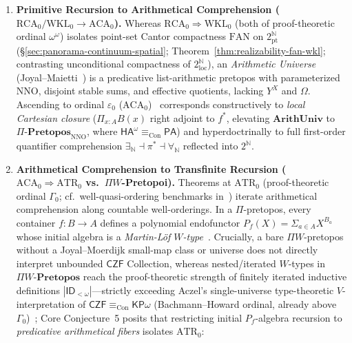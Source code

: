 \begin{enumerate}

  \item \textbf{Primitive Recursion to Arithmetical Comprehension ($\mathrm{RCA}_0 / \mathrm{WKL}_0 \to \mathrm{ACA}_0$).} Whereas $\mathrm{RCA}_0 \Rightarrow \mathrm{WKL}_0$ (both of proof-theoretic ordinal $\omega^\omega$) isolates point-set Cantor compactness $\mathrm{FAN}$ on $2^{\mathbb{N}}_{\mathrm{pt}}$ (\S\ref{sec:panorama-continuum-spatial}; Theorem~\ref{thm:realizability-fan-wkl}; contrasting unconditional compactness of $2^{\mathbb{N}}_{\mathrm{loc}}$), an \emph{Arithmetic Universe} (Joyal--Maietti~\cite{Maietti05}) is a predicative list-arithmetic pretopos with parameterized $\mathrm{NNO}$, disjoint stable sums, and effective quotients, lacking $Y^X$ and $\Omega$. Ascending to ordinal $\varepsilon_0$ ($\mathrm{ACA}_0$)~\cite{Friedman75,Simpson09} corresponds constructively to \emph{local Cartesian closure} ($\Pi_{x:A} B(x)$ right adjoint to $f^*$, elevating $\mathbf{ArithUniv}$ to $\Pi\text{-}\mathbf{Pretopos}_{\mathrm{NNO}}$, where $\mathsf{HA}^\omega \equiv_{\mathrm{Con}} \mathsf{PA}$) and hyperdoctrinally to full first-order quantifier comprehension $\exists_{\mathbb{N}} \dashv \pi^* \dashv \forall_{\mathbb{N}}$ reflected into $2^{\mathbb{N}}$.

  \item \textbf{Arithmetical Comprehension to Transfinite Recursion ($\mathrm{ACA}_0 \Rightarrow \mathrm{ATR}_0$ vs.\ $\Pi W$-Pretopoi).} Theorems at $\mathrm{ATR}_0$ (proof-theoretic ordinal $\Gamma_0$; cf.\ well-quasi-ordering benchmarks in~\cite{Friedman75,Simpson09}) iterate arithmetical comprehension along countable well-orderings. In a $\Pi$-pretopos, every container $f: B \to A$ defines a polynomial endofunctor $P_f(X) = \Sigma_{a \in A} X^{B_a}$ whose initial algebra is a \emph{Martin-L\"of $W$-type}~\cite{Maietti05}. Crucially, a bare $\Pi W$-pretopos without a Joyal--Moerdijk small-map class or universe does not directly interpret unbounded $\mathsf{CZF}$ Collection, whereas nested/iterated $W$-types in $\Pi W\text{-}\mathbf{Pretopos}$ reach the proof-theoretic strength of finitely iterated inductive definitions $|\mathsf{ID}_{<\omega}|$---strictly exceeding Aczel's single-universe type-theoretic $V$-interpretation of $\mathsf{CZF} \equiv_{\mathrm{Con}} \mathsf{KP}\omega$ (Bachmann--Howard ordinal, already above $\Gamma_0$)~\cite{Aczel78}; Core Conjecture~5 posits that restricting initial $P_f$-algebra recursion to \emph{predicative arithmetical fibers} isolates $\mathrm{ATR}_0$:


\end{enumerate}
